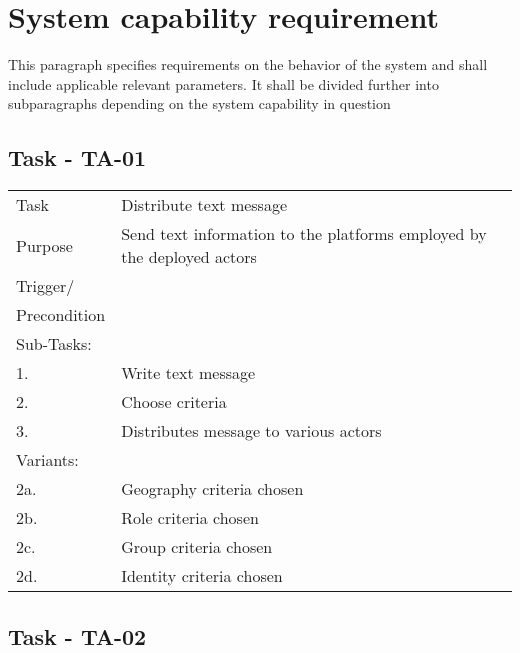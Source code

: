 
\section{System capability requirement}
This paragraph specifies requirements on the behavior of the system and shall include applicable relevant parameters. It shall be divided further into subparagraphs depending on the system capability in question

\subsection{Task - TA-01}

\begin{longtable}{| p{2.5cm}  | p{10cm} |  }
	\hline
	Task & Distribute text message \\
	Purpose & Send text information to the platforms employed by the  deployed actors \\
	Trigger/ &  \\ Precondition &  \\
	\hline
	Sub-Tasks: & \\
	1. & Write text message\\
	2. & Choose criteria \\
	3. & Distributes message to various actors \\
	\hline
	Variants: & \\
	2a. & Geography criteria chosen \\
	2b. & Role criteria chosen\\
	2c. & Group criteria chosen\\
	2d. & Identity criteria chosen\\
	\hline
\end{longtable}

\FloatBarrier
\newpage

\subsection{Task - TA-02}

